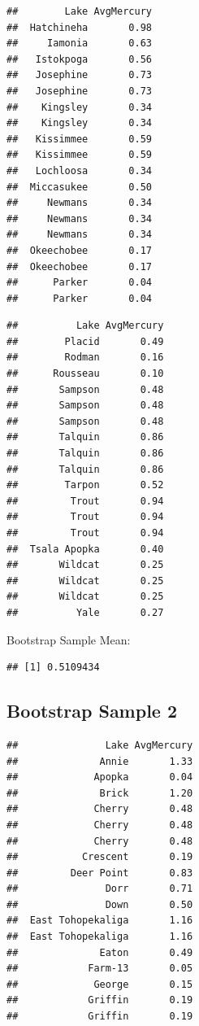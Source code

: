 \documentclass[]{book}
\newenvironment{Shaded}{\begin{snugshade}}{\end{snugshade}}
\newcommand{\KeywordTok}[1]{\textcolor[rgb]{0.13,0.29,0.53}{\textbf{#1}}}
\newcommand{\OperatorTok}[1]{\textcolor[rgb]{0.81,0.36,0.00}{\textbf{#1}}}
\newcommand{\NormalTok}[1]{#1}
\begin{document}
\begin{verbatim}
##        Lake AvgMercury
##  Hatchineha       0.98
##     Iamonia       0.63
##   Istokpoga       0.56
##   Josephine       0.73
##   Josephine       0.73
##    Kingsley       0.34
##    Kingsley       0.34
##   Kissimmee       0.59
##   Kissimmee       0.59
##   Lochloosa       0.34
##  Miccasukee       0.50
##     Newmans       0.34
##     Newmans       0.34
##     Newmans       0.34
##  Okeechobee       0.17
##  Okeechobee       0.17
##      Parker       0.04
##      Parker       0.04
\end{verbatim}

\begin{verbatim}
##          Lake AvgMercury
##        Placid       0.49
##        Rodman       0.16
##      Rousseau       0.10
##       Sampson       0.48
##       Sampson       0.48
##       Sampson       0.48
##       Talquin       0.86
##       Talquin       0.86
##       Talquin       0.86
##        Tarpon       0.52
##         Trout       0.94
##         Trout       0.94
##         Trout       0.94
##  Tsala Apopka       0.40
##       Wildcat       0.25
##       Wildcat       0.25
##       Wildcat       0.25
##          Yale       0.27
\end{verbatim}

Bootstrap Sample Mean:

\begin{Shaded}
\end{Shaded}

\begin{verbatim}
## [1] 0.5109434
\end{verbatim}

\subsection{Bootstrap Sample 2}\label{bootstrap-sample-2}

\begin{verbatim}
##               Lake AvgMercury
##              Annie       1.33
##             Apopka       0.04
##              Brick       1.20
##             Cherry       0.48
##             Cherry       0.48
##             Cherry       0.48
##           Crescent       0.19
##         Deer Point       0.83
##               Dorr       0.71
##               Down       0.50
##  East Tohopekaliga       1.16
##  East Tohopekaliga       1.16
##              Eaton       0.49
##            Farm-13       0.05
##             George       0.15
##            Griffin       0.19
##            Griffin       0.19
\end{verbatim}
\end{document}
